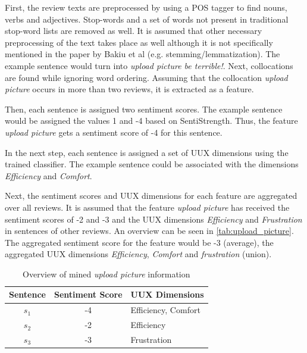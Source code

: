First, the review texts are preprocessed by using a POS tagger to find nouns, verbs and adjectives. Stop-words and a set of words not present in traditional stop-word lists are removed as well. It is assumed that other necessary preprocessing of the text takes place as well although it is not specifically mentioned in the paper by Bakiu et al (e.g. stemming/lemmatization). The example sentence would turn into \textit{upload picture be terrible!}. Next, collocations are found  while ignoring word ordering. Assuming that the collocation \textit{upload picture} occurs in more than two reviews, it is extracted as a feature.

Then, each sentence is assigned two sentiment scores. The example sentence would be assigned the values 1 and -4 based on SentiStrength. Thus, the feature \textit{upload picture} gets a sentiment score of -4 for this sentence.

In the next step, each sentence is assigned a set of UUX dimensions using the trained classifier. The example sentence could be associated with the dimensions \textit{Efficiency} and \textit{Comfort}.

Next, the sentiment scores and UUX dimensions for each feature are aggregated over all reviews. It is assumed that the feature \textit{upload picture} has received the sentiment scores of -2 and -3 and the UUX dimensions \textit{Efficiency} and \textit{Frustration} in sentences of other reviews. An overview can be seen in \autoref{tab:upload_picture}. The aggregated sentiment score for the feature would be -3 (average), the aggregated UUX dimensions \textit{Efficiency}, \textit{Comfort} and \textit{frustration} (union).

\begin{table} [t]
    \centering
    \begin{small}
    \caption{Overview of mined \textit{upload picture} information}
    \label{tab:upload_picture}
    \setlength{\tabcolsep}{1em}
    \begin{tabular}{c|c|l}
    \textbf{Sentence} & \textbf{Sentiment Score} & \textbf{UUX Dimensions} \\
    \hline
    $s_1$ & -4 & Efficiency, Comfort \\
    $s_2$ & -2 & Efficiency \\
    $s_3$ & -3 & Frustration \\
    \end{tabular}
    \end{small}
\end{table}

